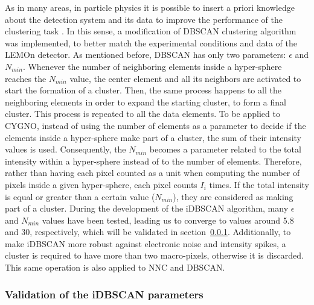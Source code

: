 \documentclass[a4paper,11pt]{article}
\begin{document}
As in many areas, in particle physics it is possible to insert a priori knowledge about the detection system and its data to improve the performance of the clustering task \cite{wagstaff2000clustering}. In this sense, a modification of DBSCAN \cite{scikit-learn} clustering algorithm was implemented, to better match the experimental conditions and data of the LEMOn detector.
As mentioned before, DBSCAN has only two parameters: $\epsilon$ and $N_{min}$. Whenever the number of neighboring elements inside a hyper-sphere reaches the $N_{min}$ value, the center element and all its neighbors are activated to start the formation of a cluster.
Then, the same process happens to all the neighboring elements in order to expand the starting cluster, to form a final cluster. This process is repeated to all the data elements.
To be applied to CYGNO, instead of using the number of elements as a parameter to decide if the elements inside a hyper-sphere make part of a cluster, the sum of their intensity values is used. Consequently, the $N_{min}$ becomes a parameter related to the total intensity within a hyper-sphere instead of to the number of elements.
Therefore, rather than having each pixel counted as a unit when computing the number of pixels inside a given hyper-sphere, each pixel counts $I_i$ times.
If the total intensity is equal or greater than a certain value ($N_{min}$), they are considered as making part of a cluster.
During the development of the iDBSCAN algorithm, many $\epsilon$ and $N_{min}$ values have been tested, leading us to converge to values around 5.8 and 30, respectively, which will be validated in section~\ref{idbscan_vali}.
Additionally, to make iDBSCAN more robust against electronic noise and intensity spikes, a cluster is required to have more than two macro-pixels, otherwise it is discarded. This same operation is also applied to NNC and DBSCAN.


\subsubsection{Validation of the iDBSCAN parameters}\label{idbscan_vali}
\end{document}
